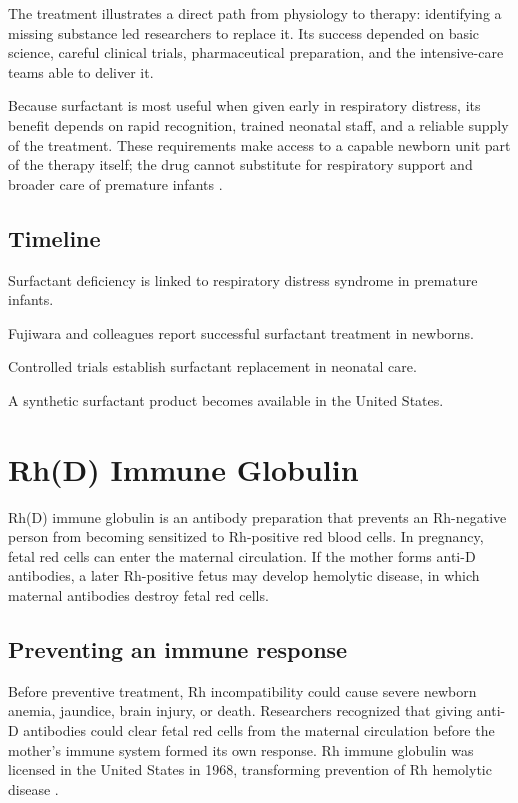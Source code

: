 \documentclass[12pt,oneside]{book}
\begin{document}
The treatment illustrates a direct path from physiology to therapy:
identifying a missing substance led researchers to replace it. Its success
depended on basic science, careful clinical trials, pharmaceutical
preparation, and the intensive-care teams able to deliver it.

Because surfactant is most useful when given early in respiratory distress,
its benefit depends on rapid recognition, trained neonatal staff, and a
reliable supply of the treatment. These requirements make access to a capable
newborn unit part of the therapy itself; the drug cannot substitute for
respiratory support and broader care of premature infants
\cite{surfactantHistory,surfactantFujiwara}.

\section*{Timeline}
\begin{description}[leftmargin=2.3cm,style=nextline]
  \item[1959] Surfactant deficiency is linked to respiratory distress syndrome in premature infants.
  \item[1980] Fujiwara and colleagues report successful surfactant treatment in newborns.
  \item[1980s--1990s] Controlled trials establish surfactant replacement in neonatal care.
  \item[1990] A synthetic surfactant product becomes available in the United States.
\end{description}
\chapter[Rh(D) Immune Globulin]{Rh(D) Immune Globulin}

Rh(D) immune globulin is an antibody preparation that prevents an Rh-negative
person from becoming sensitized to Rh-positive red blood cells. In pregnancy,
fetal red cells can enter the maternal circulation. If the mother forms anti-D
antibodies, a later Rh-positive fetus may develop hemolytic disease, in which
maternal antibodies destroy fetal red cells.

\section{Preventing an immune response}
Before preventive treatment, Rh incompatibility could cause severe newborn anemia, jaundice, brain injury, or death. Researchers recognized that giving anti-D antibodies could clear fetal red cells from the maternal circulation before the mother's immune system formed its own response. Rh immune globulin was licensed in the United States in 1968, transforming prevention of Rh hemolytic disease \cite{cdcRhHistory,dailymedRhIG}.
\end{document}

